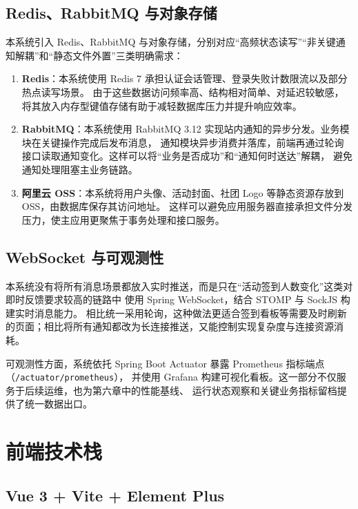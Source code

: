 \subsection{Redis、RabbitMQ 与对象存储}

本系统引入 Redis、RabbitMQ 与对象存储，分别对应“高频状态读写”“非关键通知解耦”和“静态文件外置”三类明确需求：

\begin{enumerate}
  \item \textbf{Redis}：本系统使用 Redis 7 承担认证会话管理、登录失败计数限流以及部分热点读写场景。
  由于这些数据访问频率高、结构相对简单、对延迟较敏感，将其放入内存型键值存储有助于减轻数据库压力并提升响应效率\cite{redis_docs}。

  \item \textbf{RabbitMQ}：本系统使用 RabbitMQ 3.12 实现站内通知的异步分发。业务模块在关键操作完成后发布消息，
  通知模块异步消费并落库，前端再通过轮询接口读取通知变化。这样可以将“业务是否成功”和“通知何时送达”解耦，
  避免通知处理阻塞主业务链路\cite{rabbitmq_docs}。

  \item \textbf{阿里云 OSS}：本系统将用户头像、活动封面、社团 Logo 等静态资源存放到 OSS，由数据库保存其访问地址。
  这样可以避免应用服务器直接承担文件分发压力，使主应用更聚焦于事务处理和接口服务。
\end{enumerate}

\subsection{WebSocket 与可观测性}

本系统没有将所有消息场景都放入实时推送，而是只在“活动签到人数变化”这类对即时反馈要求较高的链路中
使用 Spring WebSocket，结合 STOMP 与 SockJS 构建实时消息能力\cite{websocket_realtime}。
相比统一采用轮询，这种做法更适合签到看板等需要及时刷新的页面；相比将所有通知都改为长连接推送，又能控制实现复杂度与连接资源消耗。

可观测性方面，系统依托 Spring Boot Actuator 暴露 Prometheus 指标端点（\texttt{/actuator/prometheus}），
并使用 Grafana 构建可视化看板\cite{prometheus_docs}。这一部分不仅服务于后续运维，也为第六章中的性能基线、
运行状态观察和关键业务指标留档提供了统一数据出口。

\section{前端技术栈}

\subsection{Vue 3 + Vite + Element Plus}

